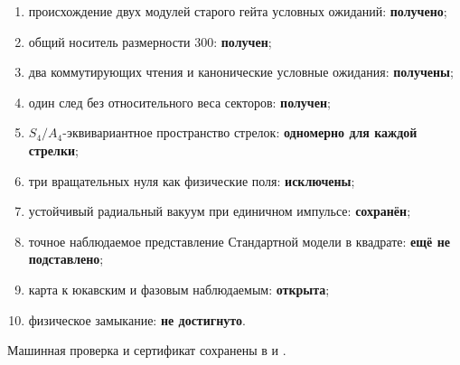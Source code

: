 \begin{protocol}
\begin{enumerate}
 \item происхождение двух модулей старого гейта условных ожиданий:
 \textbf{получено};
 \item общий носитель размерности $300$:
 \textbf{получен};
 \item два коммутирующих чтения и канонические условные ожидания:
 \textbf{получены};
 \item один след без относительного веса секторов:
 \textbf{получен};
 \item $S_4/A_4$-эквивариантное пространство стрелок:
 \textbf{одномерно для каждой стрелки};
 \item три вращательных нуля как физические поля:
 \textbf{исключены};
 \item устойчивый радиальный вакуум при единичном импульсе:
 \textbf{сохранён};
 \item точное наблюдаемое представление Стандартной модели в квадрате:
 \textbf{ещё не подставлено};
 \item карта к юкавским и фазовым наблюдаемым:
 \textbf{открыта};
 \item физическое замыкание:
 \textbf{не достигнуто}.
\end{enumerate}
\end{protocol}

Машинная проверка и сертификат сохранены в
 и
.
